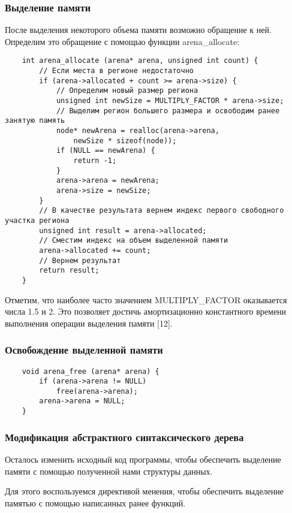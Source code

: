 \subsubsection{Выделение памяти}
После выделения некоторого объема памяти возможно обращение к ней.
Определим это обращение с помощью функции arena_allocate:
\begin{verbatim}
    int arena_allocate (arena* arena, unsigned int count) {
        // Если места в регионе недостаточно
        if (arena->allocated + count >= arena->size) {
            // Определим новый размер региона
            unsigned int newSize = MULTIPLY_FACTOR * arena->size;
            // Выделим регион большего размера и освободим ранее занятую память
            node* newArena = realloc(arena->arena,
                newSize * sizeof(node));
            if (NULL == newArena) {
                return -1;
            }
            arena->arena = newArena;
            arena->size = newSize;
        }
        // В качестве результата вернем индекс первого свободного участка региона
        unsigned int result = arena->allocated;
        // Сместим индекс на объем выделенной памяти
        arena->allocated += count;
        // Вернем результат
        return result;
    }
\end{verbatim}

Отметим, что наиболее часто значением MULTIPLY_FACTOR оказывается числа
1.5 и 2. Это позволяет достичь амортизационно константного времени выполнения операции выделения памяти [12].

\subsubsection{Освобождение выделенной памяти}
\begin{verbatim}
    void arena_free (arena* arena) {
        if (arena->arena != NULL)
            free(arena->arena);
        arena->arena = NULL;
    }
\end{verbatim}

\subsubsection{Модификация абстрактного синтаксического дерева}
Осталось изменить исходный код программы, чтобы обеспечить выделение памяти с помощью полученной нами структуры данных.

Для этого воспользуемся директивой %
менения, чтобы обеспечить выделение памятью с помощью написанных ранее
функций.

